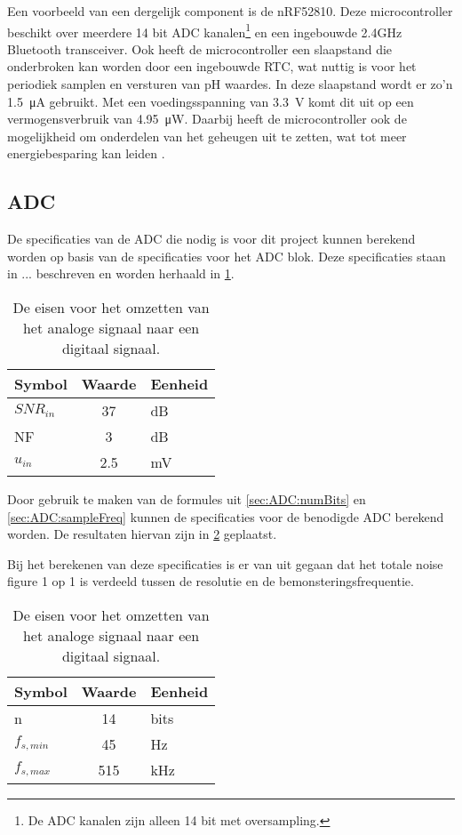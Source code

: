 Een voorbeeld van een dergelijk component is de nRF52810. Deze microcontroller beschikt over meerdere 14 bit ADC kanalen\footnote{De ADC kanalen zijn alleen 14 bit met oversampling.} en een ingebouwde 2.4GHz Bluetooth transceiver. 
Ook heeft de microcontroller een slaapstand die onderbroken kan worden door een ingebouwde RTC, wat nuttig is voor het periodiek samplen en versturen van pH waardes. In deze slaapstand wordt er zo'n \qty{1.5}{\micro\ampere} gebruikt. Met een voedingsspanning van \qty{3.3}{\volt} komt dit uit op een vermogensverbruik van \qty{4.95}{\micro\watt}. Daarbij heeft de microcontroller ook de mogelijkheid om onderdelen van het geheugen uit te zetten, wat tot meer energiebesparing kan leiden \cite{nrf52810}.


\subsection{ADC}
De specificaties van de ADC die nodig is voor dit project kunnen berekend worden op basis van de specificaties voor het ADC blok. Deze specificaties staan in ... beschreven en worden herhaald in \cref{tab:systemSpecADC}.
\begin{table}[ht]
    \centering
    \begin{tabular}{l|c|l}
        Symbol      & Waarde & Eenheid\\\hline
        $SNR_{in}$  & 37        & dB\\
        NF          & 3         & dB\\
        $u_{in}$    & 2.5       & mV\\
    \end{tabular}
    \caption{De eisen voor het omzetten van het analoge signaal naar een digitaal signaal.}
    \label{tab:systemSpecADC}
\end{table}

Door gebruik te maken van de formules uit \cref{sec:ADC:numBits} en \cref{sec:ADC:sampleFreq} kunnen de specificaties voor de benodigde ADC berekend worden. De resultaten hiervan zijn in  \cref{tab:specADC} geplaatst. 

Bij het berekenen van deze specificaties is er van uit gegaan dat het totale noise figure 1 op 1 is verdeeld tussen de resolutie en de bemonsteringsfrequentie. 
\begin{table}[ht]
    \centering
    \begin{tabular}{l|c|l}
        Symbol      & Waarde    & Eenheid\\\hline
        n           & 14        & bits\\
        $f_{s,min}$ & 45        & Hz\\
        $f_{s,max}$ & 515       & kHz\\
    \end{tabular}
    \caption{De eisen voor het omzetten van het analoge signaal naar een digitaal signaal.}
    \label{tab:specADC}
\end{table}

